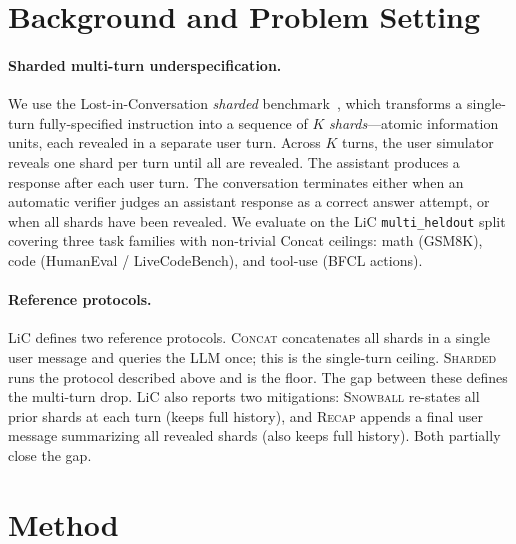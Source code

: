 \documentclass{article}
\begin{document}
\section{Background and Problem Setting}
\label{sec:background}

\paragraph{Sharded multi-turn underspecification.}
We use the Lost-in-Conversation \emph{sharded} benchmark~\citep{laban2025lost}, which transforms a single-turn fully-specified instruction into a sequence of $K$ \emph{shards}---atomic information units, each revealed in a separate user turn. Across $K$ turns, the user simulator reveals one shard per turn until all are revealed. The assistant produces a response after each user turn. The conversation terminates either when an automatic verifier judges an assistant response as a correct answer attempt, or when all shards have been revealed. We evaluate on the LiC \texttt{multi\_heldout} split covering three task families with non-trivial Concat ceilings: math (GSM8K), code (HumanEval / LiveCodeBench), and tool-use (BFCL actions).

\paragraph{Reference protocols.}
LiC defines two reference protocols. \textsc{Concat} concatenates all shards in a single user message and queries the LLM once; this is the single-turn ceiling. \textsc{Sharded} runs the protocol described above and is the floor. The gap between these defines the multi-turn drop. LiC also reports two mitigations: \textsc{Snowball} re-states all prior shards at each turn (keeps full history), and \textsc{Recap} appends a final user message summarizing all revealed shards (also keeps full history). Both partially close the gap.

\section{Method}
\label{sec:method}
\end{document}
